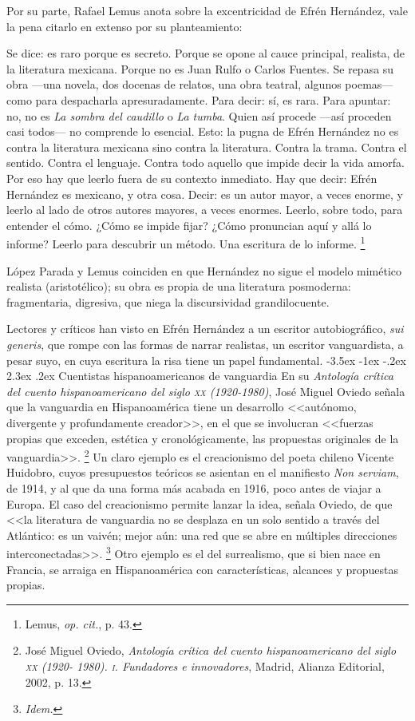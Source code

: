 \documentclass[14pt,twoside,final]{extbook} %
\makeatletter
\let\oldfootnote\footnote
\renewcommand\footnote[1]{%
\oldfootnote{\hspace{1mm}#1}}
\renewcommand\section{\@startsection {section}{1}{\z@}%
                                     {-3.5ex \@plus -1ex \@minus -.2ex}%
                                     {2.3ex \@plus .2ex}%
                                     {\normalfont\large\bfseries\sc}}
\makeatother
\begin{document}
Por su parte, Rafael Lemus anota sobre la excentricidad de Efrén Hernández, vale la pena citarlo en extenso por su planteamiento:
\begin{quoting}
Se dice: es raro porque es secreto. Porque se opone al cauce principal, realista, de la literatura mexicana. Porque no es Juan Rulfo o Carlos Fuentes. Se repasa su obra ---una novela, dos docenas de relatos, una obra teatral, algunos poemas--- como para despacharla apresuradamente. Para decir: sí, es rara. Para apuntar: no, no es \emph{La sombra del caudillo} o \emph{La tumba}. Quien así procede ---así proceden casi todos--- no comprende lo esencial. Esto: la pugna de Efrén Hernández no es contra la literatura mexicana sino contra la literatura. Contra la trama. Contra el sentido. Contra el lenguaje. Contra todo aquello que impide decir la vida amorfa. Por eso hay que leerlo fuera de su contexto inmediato. Hay que decir: Efrén Hernández es mexicano, y otra cosa. Decir: es un autor mayor, a veces enorme, y leerlo al lado de otros autores mayores, a veces enormes. Leerlo, sobre todo, para entender el cómo. ¿Cómo se impide fijar? ¿Cómo pronuncian aquí y allá lo informe? Leerlo para descubrir un método. Una escritura de lo informe.\footnote{Lemus, \emph{op. cit.}, p. 43.}
\end{quoting}
López Parada y Lemus coinciden en que Hernández no sigue el modelo mimético realista (aristotélico); su obra es propia de una literatura posmoderna: fragmentaria, digresiva, que niega la discursividad grandilocuente.

Lectores y críticos han visto en Efrén Hernández a un escritor autobiográfico, \emph{sui generis}, que rompe con las formas de narrar realistas, un escritor vanguardista, a pesar suyo, en cuya escritura la risa tiene un papel fundamental.
\section{Cuentistas hispanoamericanos de vanguardia}\label{sec:cuentistas-hispanoamericanos-de-vanguardia}
En su \emph{Antología crítica del cuento hispanoamericano del siglo \textsc{xx} (1920-1980)}, José Miguel Oviedo señala que la vanguardia en Hispanoamérica tiene un desarrollo <<autónomo, divergente y profundamente creador>>, en el que se involucran <<fuerzas propias que exceden, estética y cronológicamente, las propuestas originales de la vanguardia>>.\footnote{José Miguel Oviedo, \emph{Antología crítica del cuento hispanoamericano del siglo \textsc{xx} (1920- 1980). \textsc{i}. Fundadores e innovadores}, Madrid, Alianza Editorial, 2002, p. 13.} Un claro ejemplo es el creacionismo del poeta chileno Vicente Huidobro, cuyos presupuestos teóricos se asientan en el manifiesto \emph{Non serviam}, de 1914, y al que da una forma más acabada en 1916, poco antes de viajar a Europa. El caso del creacionismo permite lanzar la idea, señala Oviedo, de que <<la literatura de vanguardia no se desplaza en un solo sentido a través del Atlántico: es un vaivén; mejor aún: una red que se abre en múltiples direcciones interconectadas>>.\footnote{\em Idem.} Otro ejemplo es el del surrealismo, que si bien nace en Francia, se arraiga en Hispanoamérica con características, alcances y propuestas propias.
\end{document}
